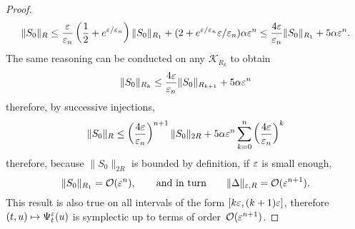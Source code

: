 \begin{proof}
\begin{equation*}
  \| S_0 \|_R
  \leq \frac{\varepsilon}{\varepsilon_n} \left(
    \frac{1}{2} + e^{\varepsilon/\varepsilon_n} 
  \right) \| S_0 \|_{R_1} 
  + (2 + e^{\varepsilon/\varepsilon_n}\varepsilon/\varepsilon_n) \alpha \varepsilon^n
  \leq \frac{4\varepsilon}{\varepsilon_n} \| S_0 \|_{R_1} + 5\alpha \varepsilon^n .
\end{equation*}
The same reasoning can be conducted on any $\mathcal{K}_{R_k}$ to obtain
\begin{equation*}
  \| S_0 \| _{R_k} 
  \leq \frac{4\varepsilon}{\varepsilon_n} \| S_0 \|_{R_{k+1}} + 5\alpha \varepsilon^n
\end{equation*}
therefore, by successive injections,
\begin{equation*}
  \| S_0 \| _R \leq \left( \frac{4\varepsilon}{\varepsilon_n} \right)^{n+1} \|S_0\| _{2R}
  + 5\alpha \varepsilon^n \sum_{k = 0}^n \left(\frac{4\varepsilon}{\varepsilon_n}\right)^k
\end{equation*}
therefore, because $\| S_0 \|_{2R}$ is bounded by definition, if $\varepsilon$
is small enough, 
\begin{equation*}
  \| S_0 \|_{R_1} = \mathcal{O}(\varepsilon^n),
  \qquad\text{and in turn}\qquad
  \| \Delta \|_{\varepsilon, R} = \mathcal{O}(\varepsilon^{n+1}) .
\end{equation*}
This result is also true on all intervals of the form $[k\varepsilon,
(k+1)\varepsilon]$, therefore $(t,u) \mapsto \Psi^\varepsilon _t(u)$ is symplectic up
to terms of order~$\mathcal{O}(\varepsilon^{n+1})$. 


\end{proof}